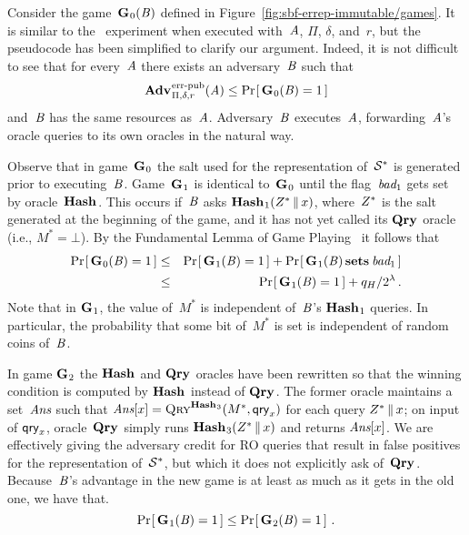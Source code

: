 Consider the game~$\textup{\textbf{G}}\hspace{0.5pt}_0(\mathit{B})$ defined in
Figure~\ref{fig:sbf-errep-immutable/games}. It is similar to the \errep\
experiment when executed with~$\mathit{A}$, $\Pi$, $\delta$, and~$r$, but the
pseudocode has been simplified to clarify our argument. Indeed, it is not
difficult to see that for every~$\mathit{A}$ there exists an adversary~$\mathit{B}$ such
that
\begin{equation}
  \Adv{\errep}_{\Pi,\delta,r}(\advA) \leq \Prob{\game_0(\advB) = 1}
\end{equation}
and~$\mathit{B}$ has the same resources as~$\mathit{A}$.
%
Adversary~$\mathit{B}$ executes~$\mathit{A}$, forwarding~$\mathit{A}$'s oracle queries
to its own oracles in the natural way.

Observe that in game~$\textup{\textbf{G}}\hspace{0.5pt}_0$ the salt used for the representation of~$\mathcal{S}^*$
is generated prior to executing~$\mathit{B}$. Game~$\textup{\textbf{G}}\hspace{0.5pt}_1$ is identical
to~$\textup{\textbf{G}}\hspace{0.5pt}_0$ until the flag~$\textit{bad}_1$ gets set by oracle~$\textup{\textbf{Hash}}\hspace{0.5pt}$. This occurs
if~$\mathit{B}$ asks $\textup{\textbf{Hash}}\hspace{0.5pt}_1(Z^* \, \| \, x)$, where~$Z^*$ is the salt generated
at the beginning of the game, and it has not yet called its $\textup{\textbf{Qry}}\hspace{0.5pt}$ oracle (i.e.,
$M^*=\bot$).
%
By the Fundamental Lemma of Game Playing~\cite{bellare2006triple} it follows
that
%
\begin{eqnarray}
  \Pr\hspace{-1pt}\left[\,\textup{\textbf{G}}\hspace{0.5pt}_0(\mathit{B})=1\,\right] &\leq&
    \Pr\hspace{-1pt}\left[\,\textup{\textbf{G}}\hspace{0.5pt}_1(\mathit{B})=1\,\right] + \Pr\hspace{-1pt}\left[\,\textup{\textbf{G}}\hspace{0.5pt}_1(\mathit{B}) \,\textup{\textbf{sets}}\hspace{0.5pt}\, \textit{bad}_1\,\right]\\
  &\leq&
    \Pr\hspace{-1pt}\left[\,\textup{\textbf{G}}\hspace{0.5pt}_1(\mathit{B})=1\,\right] + q_H/2^\lambda \,.
\end{eqnarray}
%
Note that in $\textup{\textbf{G}}\hspace{0.5pt}_1$, the value of~$M^*$ is independent of~$\mathit{B}$'s
$\textup{\textbf{Hash}}\hspace{0.5pt}_1$ queries. In particular, the probability that some bit of~$M^*$ is set
is independent of random coins of~$\mathit{B}$.

In game $\textup{\textbf{G}}\hspace{0.5pt}_2$ the $\textup{\textbf{Hash}}\hspace{0.5pt}$ and $\textup{\textbf{Qry}}\hspace{0.5pt}$ oracles have been rewritten so that
the winning condition is computed by $\textup{\textbf{Hash}}\hspace{0.5pt}$ instead of $\textup{\textbf{Qry}}\hspace{0.5pt}$. The former
oracle maintains a set~$\textit{Ans}$ such that $\textit{Ans}[x] = \textnormal{\textsc{Qry}}^{\textup{\textbf{Hash}}\hspace{0.5pt}_3}(M^*, \mathsf{qry}_x)$ for
each query $Z^* \, \| \, x$; on input of $\mathsf{qry}_x$, oracle~$\textup{\textbf{Qry}}\hspace{0.5pt}$ simply runs
$\textup{\textbf{Hash}}\hspace{0.5pt}_3(Z^* \, \| \, x)$ and returns $\textit{Ans}[x]$.
%
We are effectively giving the adversary credit for RO queries that result in
false positives for the representation of~$\mathcal{S}^*$, but which it does not
explicitly ask of~$\textup{\textbf{Qry}}\hspace{0.5pt}$. Because~$\mathit{B}$'s advantage in the new game is at
least as much as it gets in the old one, we have that.
%
\begin{equation}
  \Pr\hspace{-1pt}\left[\,\textup{\textbf{G}}\hspace{0.5pt}_1(\mathit{B})=1\,\right] \leq \Pr\hspace{-1pt}\left[\,\textup{\textbf{G}}\hspace{0.5pt}_2(\mathit{B})=1\,\right] \,.
\end{equation}

